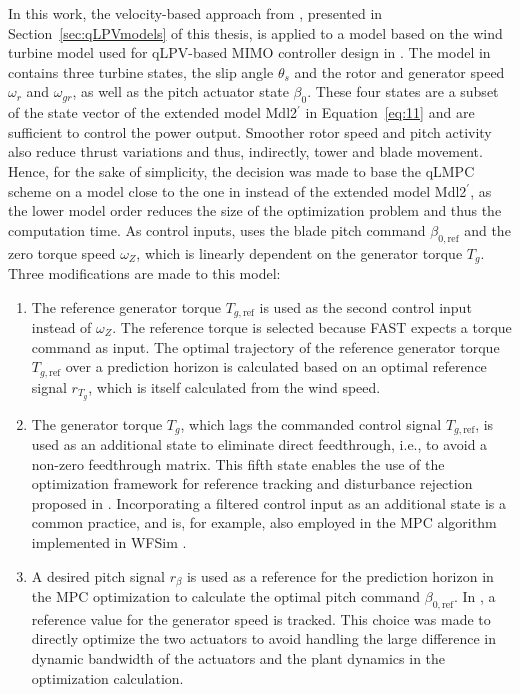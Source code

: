 In this work, the velocity-based approach from \cite{cisneros2020velocity}, presented in Section~\ref{sec:qLPVmodels} of this thesis, is applied to a model based on the wind turbine model used for qLPV-based MIMO controller design in \cite{Bianchi2007}. The model in \cite{Bianchi2007} contains three turbine states, the slip angle $\theta_s$ and the rotor and generator speed $\omega_r$ and $\omega_{gr}$, as well as the pitch actuator state $\beta_0$. These four states are a subset of the state vector of the extended model Mdl2$^\prime$ in Equation~\eqref{eq:11} and are sufficient to control the power output. Smoother rotor speed and pitch activity also reduce thrust variations and thus, indirectly, tower and blade movement. Hence, for the sake of simplicity, the decision was made to base the qLMPC scheme on a model close to the one in \cite{Bianchi2007} instead of the extended model Mdl2$^\prime$, as the lower model order reduces the size of the optimization problem and thus the computation time. As control inputs, \cite{Bianchi2007} uses the blade pitch command $\beta_{0,\text{ref}}$ and the zero torque speed $\omega_Z$, which is linearly dependent on the generator torque $T_g$. Three modifications are made to this model:
\begin{enumerate}
    \item The reference generator torque $T_{g,\text{ref}}$ is used as the second control input instead of $\omega_Z$. The reference torque is selected because FAST expects a torque command as input. The optimal trajectory of the reference generator torque $T_{g,\text{ref}}$ over a prediction horizon is calculated based on an optimal reference signal $r_{T_g}$, which is itself calculated from the wind speed.
    \item The generator torque $T_g$, which lags the commanded control signal $T_{g,\text{ref}}$, is used as an additional state to eliminate direct feedthrough, i.e., to avoid a non-zero feedthrough matrix. This fifth state enables the use of the optimization framework for reference tracking and disturbance rejection proposed in \cite{cisneros2020velocity}. Incorporating a filtered control input as an additional state is a common practice, and is, for example, also employed in the MPC algorithm implemented in WFSim \cite{boersma2018control}. %
    \item A desired pitch signal $r_{\beta}$ is used as a reference for the prediction horizon in the MPC optimization to calculate the optimal pitch command $\beta_{0,\text{ref}}$. In \cite{Bianchi2007}, a reference value for the generator speed is tracked. This choice was made to directly optimize the two actuators to avoid handling the large difference in dynamic bandwidth of the actuators and the plant dynamics in the optimization calculation.
\end{enumerate}
